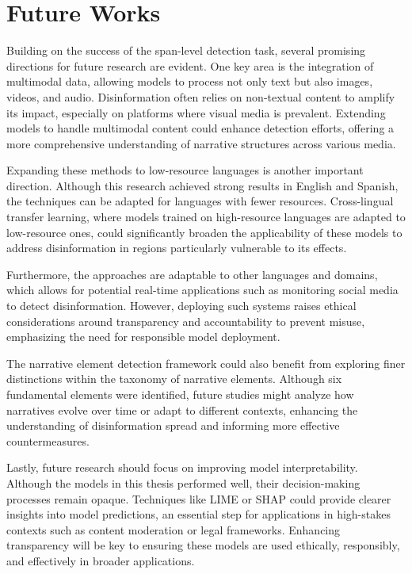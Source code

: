 \documentclass{Configuration_Files/PoliMi3i_thesis}
\begin{document}
\section{Future Works}
Building on the success of the span-level detection task, several promising directions for future research are evident. One key area is the integration of multimodal data, allowing models to process not only text but also images, videos, and audio. Disinformation often relies on non-textual content to amplify its impact, especially on platforms where visual media is prevalent. Extending models to handle multimodal content could enhance detection efforts, offering a more comprehensive understanding of narrative structures across various media.

Expanding these methods to low-resource languages is another important direction. Although this research achieved strong results in English and Spanish, the techniques can be adapted for languages with fewer resources. Cross-lingual transfer learning, where models trained on high-resource languages are adapted to low-resource ones, could significantly broaden the applicability of these models to address disinformation in regions particularly vulnerable to its effects.

Furthermore, the approaches are adaptable to other languages and domains, which allows for potential real-time applications such as monitoring social media to detect disinformation. However, deploying such systems raises ethical considerations around transparency and accountability to prevent misuse, emphasizing the need for responsible model deployment.

The narrative element detection framework could also benefit from exploring finer distinctions within the taxonomy of narrative elements. Although six fundamental elements were identified, future studies might analyze how narratives evolve over time or adapt to different contexts, enhancing the understanding of disinformation spread and informing more effective countermeasures.

Lastly, future research should focus on improving model interpretability. Although the models in this thesis performed well, their decision-making processes remain opaque. Techniques like LIME \cite{ribeiro2016model} or SHAP \cite{lundberg2017unified} could provide clearer insights into model predictions, an essential step for applications in high-stakes contexts such as content moderation or legal frameworks. Enhancing transparency will be key to ensuring these models are used ethically, responsibly, and effectively in broader applications.
\end{document}
